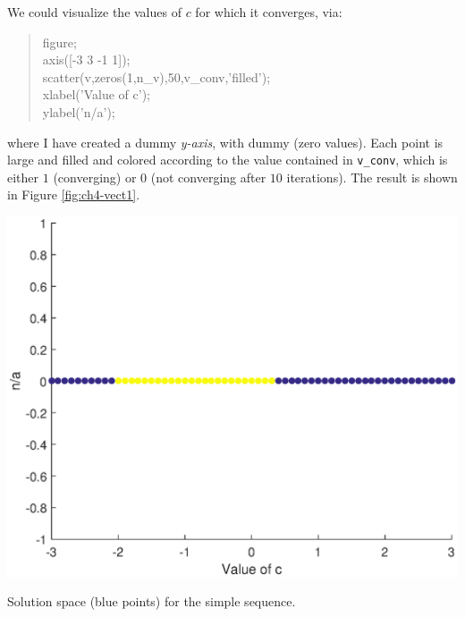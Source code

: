 \documentclass{tufte-book} %
\newenvironment{docspecmargin}{\begin{quotation}\ttfamily\footnotesize\parskip0pt\parindent0pt\ignorespaces}{\end{quotation}}
\begin{document}
We could visualize the  values of \(c\) for which it converges, via: 
\vspace{-1mm}\begin{docspecmargin}
figure;\\
axis([-3 3 -1 1]);\\
scatter(v,zeros(1,n\_v),50,v\_conv,\textcolor[rgb]{1,0,1}{'filled'});\\
xlabel(\textcolor[rgb]{1,0,1}{'Value of c'});\\
ylabel(\textcolor[rgb]{1,0,1}{'n/a'});
\end{docspecmargin}\vspace{-1mm}
where I have created a dummy \textit{y-axis}, with dummy (zero values). Each point is large and filled and colored according to the value contained in \texttt{v\_conv}, which is either \(1\) (converging) or \(0\) (not converging after \(10\) iterations). The result is shown in Figure \ref{fig:ch4-vect1}.

\begin{marginfigure}[-0.0in]
\includegraphics[width=\linewidth]{ch4-vect1.eps}
\caption{Solution space (blue points) for the simple sequence.}
\label{fig:ch4-vect1}
\end{marginfigure}

\pagebreak
\end{document}
